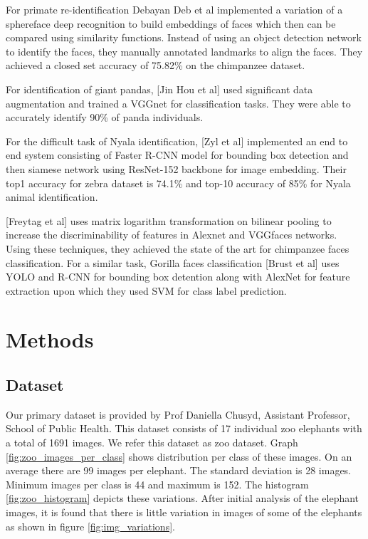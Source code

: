\documentclass[10pt,twocolumn,letterpaper]{article}
\begin{document}
For primate re-identification Debayan Deb et al \cite{Deb} implemented a variation of a sphereface deep recognition to build embeddings of faces which then can be compared using similarity functions. Instead of using an object detection network to identify the faces, they manually annotated landmarks to align the faces. They achieved a closed set accuracy of 75.82\% on the chimpanzee dataset.

For identification of giant pandas, [Jin Hou et al] \cite{Hou} used significant data augmentation and trained a VGGnet for classification tasks. They were able to accurately identify 90\% of panda individuals.

For the difficult task of Nyala identification, [Zyl et al]\cite{Zyl} implemented an end to end system consisting of Faster R-CNN model for bounding box detection and then siamese network using ResNet-152 backbone for image embedding. Their top1 accuracy for zebra dataset is 74.1\% and top-10 accuracy of 85\% for Nyala animal identification.

[Freytag et al]\cite{Freytag} uses matrix logarithm transformation on bilinear pooling to increase the discriminability of features in Alexnet and VGGfaces networks. Using these techniques, they achieved the state of the art for chimpanzee faces classification. For a similar task, Gorilla faces classification [Brust et al]\cite{Brust} uses YOLO and R-CNN for bounding box detention along with AlexNet for feature extraction upon which they used SVM for class label prediction.



\section{Methods}
\label{sec:methods}

\subsection{Dataset}
Our primary dataset is provided by Prof Daniella Chusyd, Assistant Professor, School of Public Health. This dataset consists of 17 individual zoo elephants with a total of 1691 images. We refer this dataset as zoo dataset. Graph \ref{fig:zoo_images_per_class} shows distribution per class of these images. On an average there are 99 images per elephant. The standard deviation is 28 images. Minimum images per class is 44 and maximum is 152. The histogram \ref{fig:zoo_histogram} depicts these variations. After initial analysis of the elephant images, it is found that there is little variation in images of some of the elephants as shown in figure \ref{fig:img_variations}.
\end{document}
